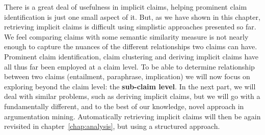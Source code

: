 There is a great deal of usefulness in implicit claims, helping prominent claim
identification is just one small aspect of it. But, as we have shown in this chapter,
retrieving implicit claims is difficult using simplistic approaches presented
so far. We feel comparing claims with some semantic similarity measure is not 
nearly enough to capture the nuances of the different relationships two claims can have.
Prominent claim identification, claim clustering and deriving implicit
claims have all thus far been employed at a claim level. To be able to 
determine relationship between two claims (entailment, paraphrase, implication)
we will now focus on exploring beyond the claim level: the \textbf{sub-claim level}. 
In the next part, we will deal with similar problems, such as deriving
implicit claims, but we will go with a fundamentally different, and to the best
of our knowledge, novel approach in argumentation mining. Automatically retrieving 
implicit claims will then be again revisited in 
chapter~\ref{chap:analysis}, but using a structured approach.
